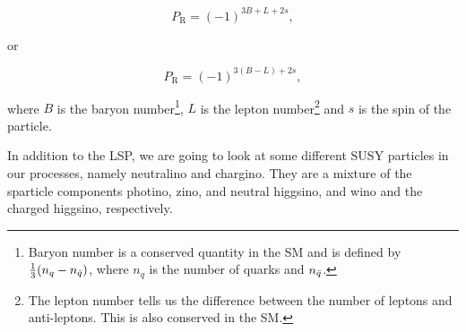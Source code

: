 \begin{equation}
    \label{eq:Rparity1}
    P_{\mathrm {R} }=(-1)^{3B+L+2s},
\end{equation}

or

\begin{equation}
    \label{eq:Rparity2}
    P_{\mathrm {R} }=(-1)^{3(B-L)+2s},
\end{equation}

where $B$ is the baryon number\footnote{Baryon number is a conserved quantity in the SM and is defined by $\frac{1}{3}(n_q - n_{\Bar{q}})$, where $n_q$ is the number of quarks and $n_{\Bar{q}}$.}, $L$ is the lepton number\footnote{The lepton number tells us the difference between the number of leptons and anti-leptons. This is also conserved in the SM.} and $s$ is the spin of the particle. 

In addition to the LSP, we are going to look at some different SUSY particles in our processes, namely neutralino and chargino. They are a mixture of the sparticle components photino, zino, and neutral higgsino, and wino and the charged higgsino, respectively.


